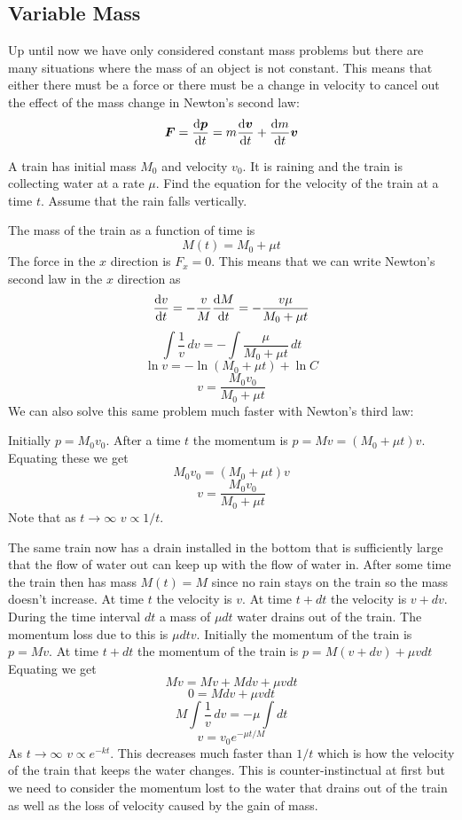 \documentclass{article}
\begin{document}
    \subsection{Variable Mass}
    Up until now we have only considered constant mass problems but there are many situations where the mass of an object is not constant.
    This means that either there must be a force or there must be a change in velocity to cancel out the effect of the mass change in Newton's second law:
    \[\bm{F} = \dv{\bm{p}}{t} = m\dv{\bm{v}}{t} + \dv{m}{t}\bm{v}\]
    
    \example
    A train has initial mass \(M_0\) and velocity \(v_0\).
    It is raining and the train is collecting water at a rate \(\mu\).
    Find the equation for the velocity of the train at a time \(t\).
    Assume that the rain falls vertically.
    
    The mass of the train as a function of time is
    \[M(t) = M_0 + \mu t\]
    The force in the \(x\) direction is \(F_x = 0\).
    This means that we can write Newton's second law in the \(x\) direction as
    \[\dv{v}{t} = -\frac{v}{M}\dv{M}{t} = -\frac{v\mu}{M_0 + \mu t}\]
    \[\int\frac{1}{v}\,dv = -\int\frac{\mu}{M_0 + \mu t}\,dt\]
    \[\ln v = -\ln(M_0 + \mu t) + \ln C\]
    \[v = \frac{M_0v_0}{M_0 + \mu t}\]
    We can also solve this same problem much faster with Newton's third law:
    
    Initially \(p = M_0v_0\).
    After a time \(t\) the momentum is \(p = Mv = (M_0 + \mu t)v\).
    Equating these we get
    \[M_0v_0 = (M_0 + \mu t)v\]
    \[v = \frac{M_0v_0}{M_0 + \mu t}\]
    Note that as \(t\to \infty\) \(v\propto 1/t\).
    
    \example
    The same train now has a drain installed in the bottom that is sufficiently large that the flow of water out can keep up with the flow of water in.
    After some time the train then has mass \(M(t) = M\) since no rain stays on the train so the mass doesn't increase.
    At time \(t\) the velocity is \(v\).
    At time \(t + dt\) the velocity is \(v + dv\).
    During the time interval \(dt\) a mass of \(\mu dt\) water drains out of the train.
    The momentum loss due to this is \(\mu dt v\).
    Initially the momentum of the train is \(p = Mv\).
    At time \(t + dt\) the momentum of the train is \(p = M(v + dv) + \mu vdt\)
    Equating we get
    \[Mv = Mv + Mdv + \mu vdt\]
    \[0 = Mdv + \mu vdt\]
    \[M\int\frac{1}{v}\,dv = -\mu\int dt\]
    \[v = v_0e^{-\mu t/M}\]
    As \(t\to\infty\) \(v\propto e^{-kt}\).
    This decreases much faster than \(1/t\) which is how the velocity of the train that keeps the water changes.
    This is counter-instinctual at first but we need to consider the momentum lost to the water that drains out of the train as well as the loss of velocity caused by the gain of mass.
    
\end{document}
